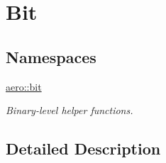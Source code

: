 \hypertarget{group__bit}{}\section{Bit}
\label{group__bit}
\subsection*{Namespaces}
\begin{DoxyCompactItemize}
\item 
 \hyperlink{namespaceaero_1_1bit}{aero\+::bit}
\begin{DoxyCompactList}\small\item\em Binary-\/level helper functions. \end{DoxyCompactList}\end{DoxyCompactItemize}


\subsection{Detailed Description}
